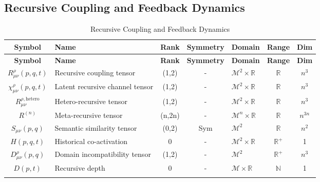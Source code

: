 
\subsection{Recursive Coupling and Feedback Dynamics}
\label{2.2.3:recursive_coupling_and_feedback_dynamics}

{\small
\renewcommand{\arraystretch}{1.1}
\begin{longtable}{|c|p{5.5cm}|c|c|p{1.8cm}|c|c|}
\hline
\textbf{Symbol} & \textbf{Name} & \textbf{Rank} & \textbf{Symmetry} & \textbf{Domain} & \textbf{Range} & \textbf{Dim} \\
\hline
\endfirsthead
\hline
\textbf{Symbol} & \textbf{Name} & \textbf{Rank} & \textbf{Symmetry} & \textbf{Domain} & \textbf{Range} & \textbf{Dim} \\
\hline
\endhead
\(R^\rho_{\mu\nu}(p,q,t)\) & Recursive coupling tensor & (1,2) & - & \(\mathcal{M}^2 \times \mathbb{R}\) & \(\mathbb{R}\) & \(n^3\) \\
\hline
\(\chi^\rho_{\mu\nu}(p,q,t)\) & Latent recursive channel tensor & (1,2) & - & \(\mathcal{M}^2 \times \mathbb{R}\) & \(\mathbb{R}\) & \(n^3\) \\
\hline
\(R^{\rho, \text{hetero}}_{\mu\nu}\) & Hetero-recursive tensor & (1,2) & - & \(\mathcal{M}^2 \times \mathbb{R}\) & \(\mathbb{R}\) & \(n^3\) \\
\hline
\(R^{(n)}\) & Meta-recursive tensor & (n,2n) & - & \(\mathcal{M}^n \times \mathbb{R}\) & \(\mathbb{R}\) & \(n^{3n}\) \\
\hline
\(S_{\mu\nu}(p,q)\) & Semantic similarity tensor\footnotemark[2] & (0,2) & Sym & \(\mathcal{M}^2\) & \(\mathbb{R}\) & \(n^2\) \\
\hline
\(H(p,q,t)\) & Historical co-activation\footnotemark[3] & 0 & - & \(\mathcal{M}^2 \times \mathbb{R}\) & \(\mathbb{R}^+\) & 1 \\
\hline
\(D^\rho_{\mu\nu}(p,q)\) & Domain incompatibility tensor & (1,2) & - & \(\mathcal{M}^2\) & \(\mathbb{R}^+\) & \(n^3\) \\
\hline
\(D(p,t)\) & Recursive depth & 0 & - & \(\mathcal{M} \times \mathbb{R}\) & \(\mathbb{N}\) & 1 \\
\hline
\caption{Recursive Coupling and Feedback Dynamics}
\end{longtable}
}


